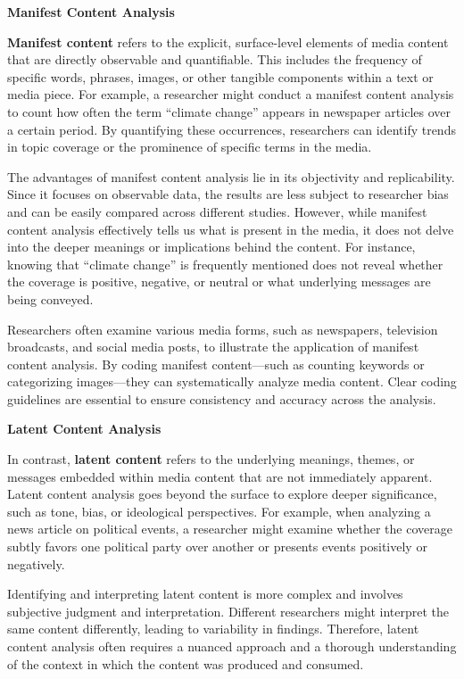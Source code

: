\documentclass[
]{book}
\begin{document}
\textbf{Manifest Content Analysis}

\textbf{Manifest content} refers to the explicit, surface-level elements of media content that are directly observable and quantifiable. This includes the frequency of specific words, phrases, images, or other tangible components within a text or media piece. For example, a researcher might conduct a manifest content analysis to count how often the term ``climate change'' appears in newspaper articles over a certain period. By quantifying these occurrences, researchers can identify trends in topic coverage or the prominence of specific terms in the media.

The advantages of manifest content analysis lie in its objectivity and replicability. Since it focuses on observable data, the results are less subject to researcher bias and can be easily compared across different studies. However, while manifest content analysis effectively tells us what is present in the media, it does not delve into the deeper meanings or implications behind the content. For instance, knowing that ``climate change'' is frequently mentioned does not reveal whether the coverage is positive, negative, or neutral or what underlying messages are being conveyed.

Researchers often examine various media forms, such as newspapers, television broadcasts, and social media posts, to illustrate the application of manifest content analysis. By coding manifest content---such as counting keywords or categorizing images---they can systematically analyze media content. Clear coding guidelines are essential to ensure consistency and accuracy across the analysis.

\textbf{Latent Content Analysis}

In contrast, \textbf{latent content} refers to the underlying meanings, themes, or messages embedded within media content that are not immediately apparent. Latent content analysis goes beyond the surface to explore deeper significance, such as tone, bias, or ideological perspectives. For example, when analyzing a news article on political events, a researcher might examine whether the coverage subtly favors one political party over another or presents events positively or negatively.

Identifying and interpreting latent content is more complex and involves subjective judgment and interpretation. Different researchers might interpret the same content differently, leading to variability in findings. Therefore, latent content analysis often requires a nuanced approach and a thorough understanding of the context in which the content was produced and consumed.
\end{document}

